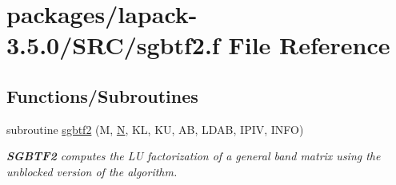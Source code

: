 \hypertarget{sgbtf2_8f}{}\section{packages/lapack-\/3.5.0/\+S\+R\+C/sgbtf2.f File Reference}
\label{sgbtf2_8f}
\subsection*{Functions/\+Subroutines}
\begin{DoxyCompactItemize}
\item 
subroutine \hyperlink{group__realGBcomputational_ga0bcc0fe084053d5fb44740646a0abcb9}{sgbtf2} (M, \hyperlink{polmisc_8c_a0240ac851181b84ac374872dc5434ee4}{N}, K\+L, K\+U, A\+B, L\+D\+A\+B, I\+P\+I\+V, I\+N\+F\+O)
\begin{DoxyCompactList}\small\item\em {\bfseries S\+G\+B\+T\+F2} computes the L\+U factorization of a general band matrix using the unblocked version of the algorithm. \end{DoxyCompactList}\end{DoxyCompactItemize}

